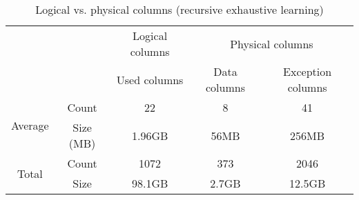 \begin{table}[h]
\centering
\begin{tabular}{cc|c|cc}
                         &           & Logical columns & \multicolumn{2}{c}{Physical columns} \\
                         &           & Used columns    & Data columns   & Exception columns   \\ \hline
\multirow{2}{*}{Average} & Count     & 22              & 8              & 41                  \\
                         & Size (MB) & 1.96GB          & 56MB           & 256MB               \\ \hline
\multirow{2}{*}{Total}   & Count     & 1072            & 373            & 2046                \\
                         & Size      & 98.1GB          & 2.7GB          & 12.5GB             
\end{tabular}
\caption{Logical vs. physical columns (recursive exhaustive learning)}
\label{tab:eval:results:recexh:analysis1}
\end{table}